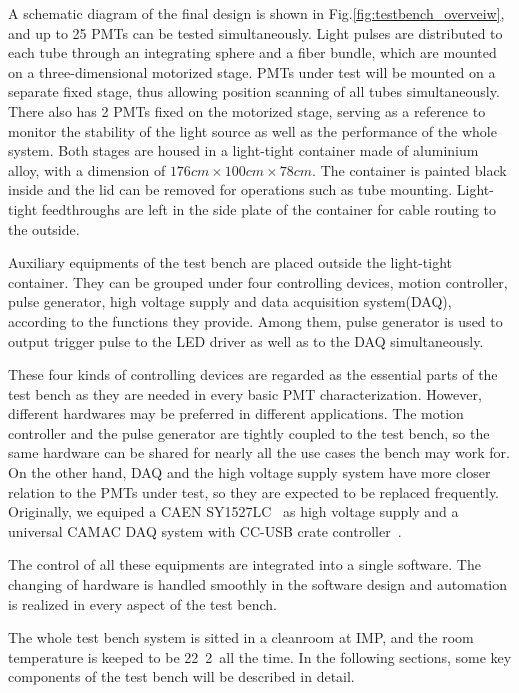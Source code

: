 \documentclass[review, times]{elsarticle}
\begin{document}
A schematic diagram of the final design is shown in Fig.\ref{fig:testbench_overveiw}, and up to 25 PMTs can be tested simultaneously.
Light pulses are distributed to each tube through an integrating sphere and a fiber bundle, which are mounted on a three-dimensional motorized stage.
PMTs under test will be mounted on a separate fixed stage, thus allowing position scanning of all tubes simultaneously.
There also has 2 PMTs fixed on the motorized stage, serving as a reference to monitor the stability of the light source as well as the performance of the whole system.
Both stages are housed in a light-tight container made of aluminium alloy, with a dimension of $176cm\times100cm\times78cm$.
The container is painted black inside and the lid can be removed for operations such as tube mounting.
Light-tight feedthroughs are left in the side plate of the container for cable routing to the outside.

Auxiliary equipments of the test bench are placed outside the light-tight container.
They can be grouped under four controlling devices, motion controller, pulse generator, high voltage supply and data acquisition system(DAQ), according to the functions they provide.
Among them, pulse generator is used to output trigger pulse to the LED driver as well as to the DAQ simultaneously.

These four kinds of controlling devices are regarded as the essential parts of the test bench as they are needed in every basic PMT characterization.
However, different hardwares may be preferred in different applications.
The motion controller and the pulse generator are tightly coupled to the test bench, so the same hardware can be shared for nearly all the use cases the bench may work for. 
On the other hand, DAQ and the high voltage supply system have more closer relation to the PMTs under test, so they are expected to be replaced frequently. 
Originally, we equiped a CAEN SY1527LC~\cite{sy1527lc} as high voltage supply and a universal CAMAC DAQ system with CC-USB crate controller~\cite{cc_usb}.

The control of all these equipments are integrated into a single software. 
The changing of hardware is handled smoothly in the software design and automation is realized in every aspect of the test bench.

The whole test bench system is sitted in a cleanroom at IMP, and the room temperature is keeped to be 22\textpm~2\textcelsius~all the time.
In the following sections, some key components of the test bench will be described in detail.
\end{document}
